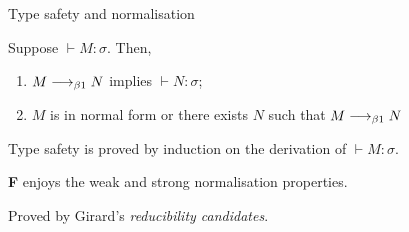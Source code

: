 %
%
%  

\begin{frame}{Type safety and normalisation}
  \begin{theorem}
    Suppose $\vdash M : \sigma$. Then, 
    \begin{enumerate}
      \item $M \longrightarrow_{\beta1} N$ implies $\vdash N : \sigma$; 
      \item $M$ is in normal form or there exists $N$ such that $M \longrightarrow_{\beta1} N$
    \end{enumerate}
  \end{theorem}
  Type safety is proved by induction on the derivation of $\vdash M : \sigma$.

  \begin{theorem}
    \textbf{F} enjoys the weak and strong normalisation properties.
  \end{theorem}
  Proved by Girard's \emph{reducibility candidates}.
\end{frame}

